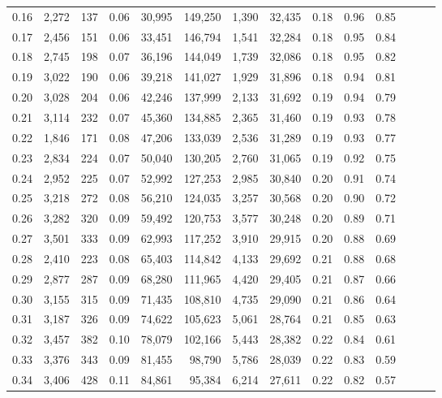 \begin{tabular}{rrrrrrrrrrrrrr}
0.16 &  2,272 &  137 &  0.06 &   30,995 &  149,250 &   1,390 &  32,435 &  0.18 &  0.96 &      0.85 \\
0.17 &  2,456 &  151 &  0.06 &   33,451 &  146,794 &   1,541 &  32,284 &  0.18 &  0.95 &      0.84 \\
0.18 &  2,745 &  198 &  0.07 &   36,196 &  144,049 &   1,739 &  32,086 &  0.18 &  0.95 &      0.82 \\
0.19 &  3,022 &  190 &  0.06 &   39,218 &  141,027 &   1,929 &  31,896 &  0.18 &  0.94 &      0.81 \\
0.20 &  3,028 &  204 &  0.06 &   42,246 &  137,999 &   2,133 &  31,692 &  0.19 &  0.94 &      0.79 \\
0.21 &  3,114 &  232 &  0.07 &   45,360 &  134,885 &   2,365 &  31,460 &  0.19 &  0.93 &      0.78 \\
0.22 &  1,846 &  171 &  0.08 &   47,206 &  133,039 &   2,536 &  31,289 &  0.19 &  0.93 &      0.77 \\
0.23 &  2,834 &  224 &  0.07 &   50,040 &  130,205 &   2,760 &  31,065 &  0.19 &  0.92 &      0.75 \\
0.24 &  2,952 &  225 &  0.07 &   52,992 &  127,253 &   2,985 &  30,840 &  0.20 &  0.91 &      0.74 \\
0.25 &  3,218 &  272 &  0.08 &   56,210 &  124,035 &   3,257 &  30,568 &  0.20 &  0.90 &      0.72 \\
0.26 &  3,282 &  320 &  0.09 &   59,492 &  120,753 &   3,577 &  30,248 &  0.20 &  0.89 &      0.71 \\
0.27 &  3,501 &  333 &  0.09 &   62,993 &  117,252 &   3,910 &  29,915 &  0.20 &  0.88 &      0.69 \\
0.28 &  2,410 &  223 &  0.08 &   65,403 &  114,842 &   4,133 &  29,692 &  0.21 &  0.88 &      0.68 \\
0.29 &  2,877 &  287 &  0.09 &   68,280 &  111,965 &   4,420 &  29,405 &  0.21 &  0.87 &      0.66 \\
0.30 &  3,155 &  315 &  0.09 &   71,435 &  108,810 &   4,735 &  29,090 &  0.21 &  0.86 &      0.64 \\
0.31 &  3,187 &  326 &  0.09 &   74,622 &  105,623 &   5,061 &  28,764 &  0.21 &  0.85 &      0.63 \\
0.32 &  3,457 &  382 &  0.10 &   78,079 &  102,166 &   5,443 &  28,382 &  0.22 &  0.84 &      0.61 \\
0.33 &  3,376 &  343 &  0.09 &   81,455 &   98,790 &   5,786 &  28,039 &  0.22 &  0.83 &      0.59 \\
0.34 &  3,406 &  428 &  0.11 &   84,861 &   95,384 &   6,214 &  27,611 &  0.22 &  0.82 &      0.57 \\

\end{tabular}
